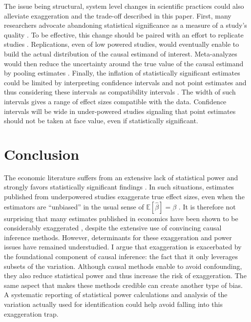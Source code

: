 \documentclass[usletter, 12pt]{article}
\begin{document}
		The issue being structural, system level changes in scientific practices could also alleviate exaggeration and the trade-off described in this paper. First, many researchers advocate abandoning statistical significance as a measure of a study's quality \citep{mcshane_abandon_2019}. To be effective, this change should be paired with an effort to replicate studies \citep{christensen_transparency_2018}. Replications, even of low powered studies, would eventually enable to build the actual distribution of the causal estimand of interest. Meta-analyzes would then reduce the uncertainty around the true value of the causal estimand by pooling estimates \citep{hernan_causal_2021}. Finally, the inflation of statistically significant estimates could be limited by interpreting confidence intervals and not point estimates and thus considering these intervals as compatibility intervals \citep{shadish_experimental_2002, amrhein_inferential_2019, romer_praise_2020}. The width of such intervals gives a range of effect sizes compatible with the data. Confidence intervals will be wide in under-powered studies signaling that point estimates should not be taken at face value, even if statistically significant.




\section{Conclusion} \label{conclusion}

	The economic literature suffers from an extensive lack of statistical power \citep{ioannidis_power_2017} and strongly favors statistically significant findings \citep[for instance]{rosenthal_file_1979, andrews_identification_2019, abadie_statistical_2020, brodeur_methods_2020}. In such situations, estimates published from underpowered studies exaggerate true effect sizes, even when the estimators are ``unbiased'' in the usual sense of $\mathbb{E}[\hat{\beta}] = \beta$ \citep{ioannidis_why_2008, gelman_beyond_2014, lu_note_2019, zwet_significance_2021}. It is therefore not surprising that many estimates published in economics have been shown to be considerably exaggerated  \citep{camerer_evaluating_2016, ioannidis_power_2017}, despite the extensive use of convincing causal inference methods.  However, determinants for these exaggeration and power issues have remained understudied. I argue that exaggeration is exacerbated by the foundational component of causal inference: the fact that it only leverages subsets of the variation. Although causal methods enable to avoid confounding, they also reduce statistical power and thus increase the risk of exaggeration. The same aspect that makes these methods credible can create another type of bias. A systematic reporting of statistical power calculations and analysis of the variation actually used for identification could help avoid falling into this exaggeration trap.
	
\end{document}
